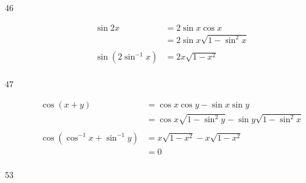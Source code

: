 \documentclass{exam}
\begin{document}
\begin{description}
      \item[46]
        \begin{align*}
          \sin 2x & = 2 \sin x \cos x \\
                  & = 2 \sin x \sqrt{1 - \sin^2 x} \\
                  \\
          \sin \left( 2 \sin^{-1} x \right) & = \boxed{ 2x \sqrt{1 - x^2} } \\
        \end{align*}

      \item[47]
        \begin{align*}
          \cos(x + y) & = \cos x \cos y - \sin x \sin y \\
                      & = \cos x \sqrt{1 - \sin^2 y} -  \sin y \sqrt{1 - \sin^2 x} \\
                      \\
          \cos(\cos^{-1} x + \sin^{-1} y) & = x \sqrt{1 - x^2} - x \sqrt{1 - x^2} \\
                                          & = \boxed{ 0 } \\
        \end{align*}

      \item[53]


\end{description}
\end{document}
